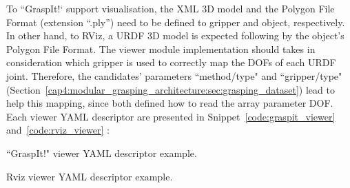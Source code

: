 To ``GraspIt!` support visualisation, the XML 3D model and the Polygon File Format (extension ``.ply'') need to be defined to gripper and object, respectively. In other hand, to RViz, a URDF 3D model is expected following by the object's Polygon File Format. The viewer module implementation should takes in consideration which gripper is used to correctly map the DOFs of each URDF joint. Therefore, the candidates' parameters ``method/type" and ``gripper/type"  (Section~\ref{cap4:modular_grasping_architecture:sec:grasping_dataset}) lead to help this mapping, since both defined how to read the array parameter \ac{DOF}. Each viewer YAML descriptor are presented in Snippet~\ref{code:graspit_viewer} and~\ref{code:rviz_viewer} : 

\begin{snippet}[h!]
\centering
{}
\caption{``GraspIt!" viewer YAML descriptor example.}
\label{code:graspit_viewer}
\end{snippet}

\begin{snippet}[h!]
\centering
{}
\caption{Rviz viewer YAML descriptor example.}
\label{code:rviz_viewer}
\end{snippet}



